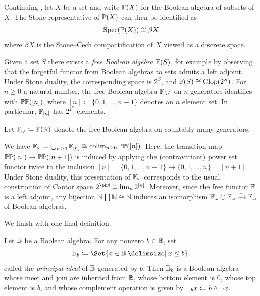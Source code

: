\documentclass{amsart}
\begin{document}
    \begin{Exa}\label{exa:stonecech}
        Continuing , let $X$ be a set and write $\mathbb{P}(X)$ for the Boolean algebra of subsets of $X$. The Stone representative of $\mathbb{P}(X)$ can then be identified as
            \[
                \operatorname{Spec}(\mathbb{P}(X)) \cong \beta X
            \]
        where $\beta X$ is the Stone--\v{C}ech compactification of $X$ viewed as a discrete space.
    \end{Exa}
    \begin{Exa}
        Given a set $S$ there exists a \emph{free Boolean algebra} $\mathbb{F}(S)$, for example by observing that the forgetful functor from Boolean algebras to sets admits a left adjoint. Under Stone duality, the corresponding space is $2^S$, and $\mathbb{F}(S) \cong \operatorname{Clop}(2^S)$. For $n \geq 0$ a natural number, the free Boolean algebra $\mathbb{F}_{[n]}$ on $n$ generators identifies with $\mathbb{P}\mathbb{P}([n])$, where $[n]\coloneqq \{0,1,\ldots,n-1\}$ denotes an $n$ element set. In particular, $\mathbb{F}_{[n]}$ has $2^{2^n}$ elements.
    \end{Exa}
    \begin{Def}
        Let $\mathbb{F}_\omega \coloneqq \mathbb{F}(\mathbb{N})$ denote the free Boolean algebra on countably many generators.
    \end{Def}
    
    \begin{Rem}\label{rem:coproductFw}
        We have $\mathbb{F}_{\omega} = \bigcup_{n\geq 0} \mathbb{F}_{[n]} \cong \operatorname{colim}_{n \geq 0}\mathbb{P}\mathbb{P}([n])$. Here, the transition map $\mathbb{P}\mathbb{P}([n]) \to \mathbb{P}\mathbb{P}([n+1])$ is induced by applying the (contravariant) power set functor twice to the inclusion $[n]=\{0,1,\ldots,n-1\} \to \{0,1,\ldots,n\} =  [n+1]$. Under Stone duality, this presentation of $\mathbb{F}_{\omega}$ corresponds to the usual construction of Cantor space $2^{\bbN} \cong \lim_n 2^{[n]}$. Moreover, since the free functor $\mathbb{F}$ is a left adjoint, any bijection $\mathbb{N} \amalg \mathbb{N} \cong \mathbb{N}$ induces an isomorphism $\mathbb{F}_{\omega} \oplus \mathbb{F}_{\omega} \xrightarrow{\sim} \mathbb{F}_{\omega}$ of Boolean algebras. 
    \end{Rem}
    
    We finish with one final definition. 
    
    \begin{Def}\label{def:principal-ideal}
        Let $\mathbb{B}$ be a Boolean algebra. For any nonzero $b \in \mathbb{B}$, set
        \[
            \ba{B}_b \coloneqq \Set{x \in \ba{B}\given x \leq b},
        \]
        called the \emph{principal ideal} of $\mathbb{B}$ generated by $b$. Then $\mathbb{B}_b$ is a Boolean algebra whose meet and join are inherited from $\mathbb{B}$, whose bottom element is $0$, whose top element is $b$, and whose complement operation is given by $\neg_b x \coloneqq b \land \neg x$.
    \end{Def}
    
\end{document}
